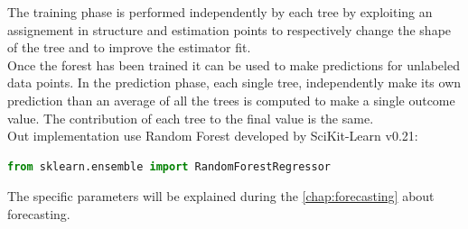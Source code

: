 \documentclass[%
    corpo=12pt,
    twoside,
    oldstyle,
    autoretitolo,
    greek,
    evenboxes,
]{toptesi}
\begin{document}
The training phase is performed independently by each tree by exploiting an assignement in structure and estimation points to respectively change the shape of the tree and to improve the estimator fit.\\
Once the forest has been trained it can be used to make predictions for unlabeled data points. In the prediction phase, each single tree, independently make its own prediction than an average of all the trees is computed to make a single outcome value. The contribution of each tree to the final value is the same.\\
Out implementation use Random Forest developed by SciKit-Learn v0.21:
\begin{lstlisting}[language=python, frame=single]
  from sklearn.ensemble import RandomForestRegressor
\end{lstlisting}
The specific parameters will be explained during the \autoref{chap:forecasting} about forecasting.
\end{document}
